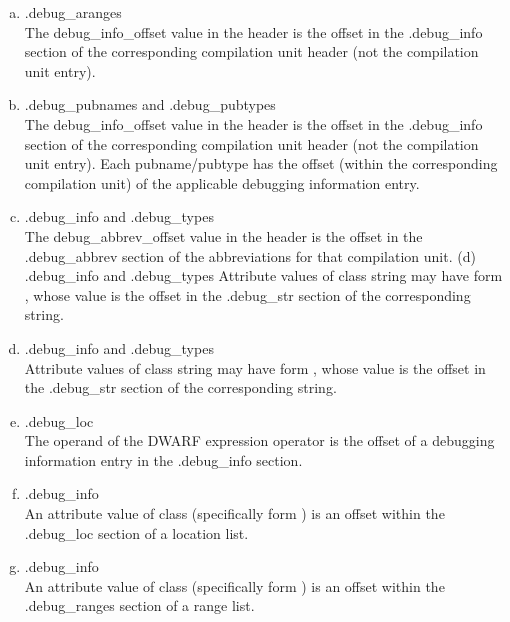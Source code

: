 \clearpage
\begin{enumerate}[(a)]  
\item  .debug\_aranges  \\
The debug\_info\_offset value in
the header is the offset in the .debug\_info section of the
corresponding compilation unit header (not the compilation
unit entry).

\item .debug\_pubnames and .debug\_pubtypes \\
The debug\_info\_offset value in the header is the offset in the
.debug\_info section of the corresponding compilation unit header (not
the compilation unit entry). Each pubname/pubtype has the offset (within
the corresponding compilation unit) of the applicable debugging
information entry.

\item .debug\_info and .debug\_types \\
The debug\_abbrev\_offset value in the header is the offset in the
.debug\_abbrev section of the abbreviations for that compilation unit.
(d) .debug\_info and .debug\_types
Attribute values of class string may have form , whose
value is the offset in the .debug\_str section of the corresponding string.

\item  .debug\_info and .debug\_types \\
Attribute values of class string may have form , whose
value is the offset in the .debug\_str section of the corresponding string.

\item .debug\_loc \\
The operand of the  DWARF expression operator is the
offset of a debugging information entry in the .debug\_info section.

\item .debug\_info \\
An attribute value of class  (specifically form
) is an offset within the .debug\_loc section of a
location list.

\item .debug\_info \\
An attribute value of class  (specifically form
) is an offset within the .debug\_ranges section of
a range list.



\end{enumerate}
